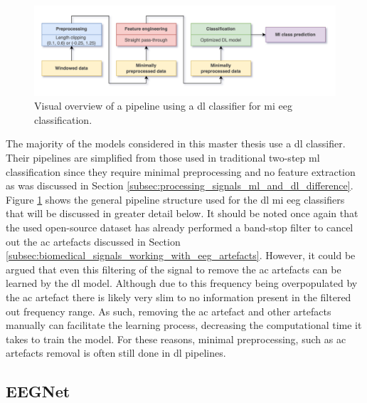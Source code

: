\begin{figure}[t]
    \centering
    \includegraphics[width=\linewidth]{../images/pipeline/dl_pipeline.pdf}
    \captionsetup{width=0.8\linewidth}
    \captionsetup{justification=centering}
    \caption{Visual overview of a pipeline using a \gls{dl} classifier for \gls{mi} \gls{eeg} classification.}
    \label{fig:offline_bci_system_dl_pipeline}
\end{figure}

The majority of the models considered in this master thesis use a \gls{dl} classifier.
Their pipelines are simplified from those used in traditional two-step \gls{ml} classification since they require minimal preprocessing and no feature extraction as was discussed in Section \ref{subsec:processing_signals_ml_and_dl_difference}.
Figure \ref{fig:offline_bci_system_dl_pipeline} shows the general pipeline structure used for the \gls{dl} \gls{mi} \gls{eeg} classifiers that will be discussed in greater detail below.
It should be noted once again that the used open-source dataset has already performed a band-stop filter to cancel out the \gls{ac} artefacts discussed in Section \ref{subsec:biomedical_signals_working_with_eeg_artefacts}.
However, it could be argued that even this filtering of the signal to remove the \gls{ac} artefacts can be learned by the \gls{dl} model.
Although due to this frequency being overpopulated by the \gls{ac} artefact there is likely very slim to no information present in the filtered out frequency range.
As such, removing the \gls{ac} artefact and other artefacts manually can facilitate the learning process, decreasing the computational time it takes to train the model.
For these reasons, minimal preprocessing, such as \gls{ac} artefacts removal is often still done in \gls{dl} pipelines.



\subsection{EEGNet}
\label{subsec:offline_bci_system_one_step_dl_eegnet}

